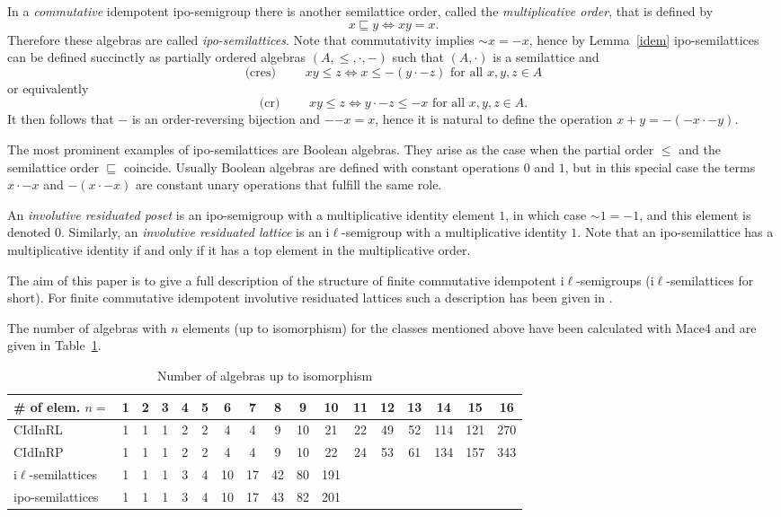 \documentclass[12pt]{amsart}
\renewcommand{\ln}{{\sim}}
\newcommand{\rn}{{-}}
\begin{document}
In a \emph{commutative} idempotent ipo-semigroup there is another semilattice order, called the \emph{multiplicative order}, that is defined by
$$x\sqsubseteq y \iff xy=x.$$ Therefore these algebras are called \emph{ipo-semilattices}.
Note that commutativity implies $\ln x = \rn x$, hence by Lemma~\ref{idem} ipo-semilattices can be defined succinctly as partially ordered algebras $(A,\le,\cdot,-)$ such that $(A,\cdot)$ is a semilattice
and
$$\text{(cres) }\qquad xy\le z\iff x\le \rn(y\cdot\rn z)\text{ \ \  for all }x,y,z\in A$$
or equivalently
$$\text{(cr) }\qquad xy\le z\iff y\cdot\rn z\le \rn x\text{ \ \  for all }x,y,z\in A.$$
It then follows that $-$ is an order-reversing bijection and $-{-x}=x$, hence it is natural to define the operation $x+y=-(-x\cdot -y)$.

The most prominent examples of ipo-semilattices are Boolean algebras. They arise as the case when the partial order $\le$ and the semilattice order $\sqsubseteq$ coincide. Usually Boolean algebras are defined with constant operations $0$ and $1$, but in this special case the terms $x\cdot -x$ and $-(x\cdot -x)$ are constant unary operations that fulfill the same role.

An \emph{involutive residuated poset} is an ipo-semigroup with a multiplicative identity element $1$, in which case $\ln 1=\rn 1$, and this element is denoted $0$. Similarly, an \emph{involutive residuated lattice} is an i$\ell$-semigroup with a multiplicative identity $1$.
Note that an ipo-semilattice has a multiplicative identity if and only if
it has a top element in the multiplicative order.

The aim of this paper is to give a full description of the structure of finite commutative idempotent i$\ell$-semigroups (i$\ell$-semilattices for short). For finite commutative idempotent involutive residuated lattices such a description has been given in \cite{JTV2020}.

The number of algebras with $n$ elements (up to isomorphism) for the classes mentioned above have been calculated with Mace4 \cite{McC2010} and are given in Table~\ref{size-n}.

\begin{table}
\begin{tabular}{l|cccccccccccccccc}
\# of elem. $n=$   &1&2&3&4&5& 6& 7& 8& 9&10&11&12&13&14&15&16\\\hline
CIdInRL       &1&1&1&2&2& 4& 4& 9&10&21&22&49&52&114&121&270\\
CIdInRP       &1&1&1&2&2& 4& 4& 9&10&22&24&53&61&134&157&343\\
i$\ell$-semilattices  &1&1&1&3&4&10&17&42&80&191&&&&&&\\
ipo-semilattices      &1&1&1&3&4&10&17&43&82&201&&&&&&\\
\end{tabular}

\medskip

\caption{Number of algebras up to isomorphism}\label{size-n}
\end{table}
\end{document}
